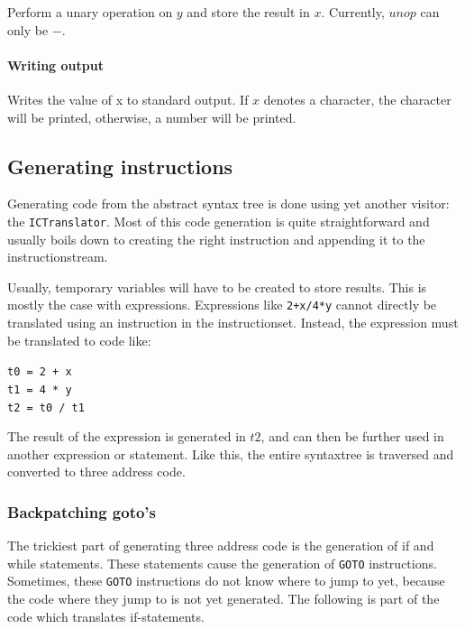 \documentclass[a4paper]{article}
\begin{document}
Perform a unary operation on $y$ and store the result in $x$. Currently,
$unop$ can only be $-$.

\paragraph{Writing output\\}

Writes the value of x to standard output. If $x$ denotes a character, the
character will be printed, otherwise, a number will be printed.

\subsection{Generating instructions}

Generating code from the abstract syntax tree is done using yet another
visitor: the \texttt{ICTranslator}. Most of this code generation is quite
straightforward and usually boils down to creating the right instruction and
appending it to the instructionstream.

Usually, temporary variables will have to be created to store results. This is
mostly the case with expressions. Expressions like \texttt{2+x/4*y} cannot
directly be translated using an instruction in the instructionset. Instead,
the expression must be translated to code like:
\begin{center}
\texttt{t0 = 2 + x}\\
\texttt{t1 = 4 * y}\\
\texttt{t2 = t0 / t1}\\
\end{center}

The result of the expression is generated in $t2$, and can then be further
used in another expression or statement. Like this, the entire syntaxtree is
traversed and converted to three address code.

\subsubsection{Backpatching goto's}

The trickiest part of generating three address code is the generation of if
and while statements. These statements cause the generation of \texttt{GOTO}
instructions. Sometimes, these \texttt{GOTO} instructions do not know where to
jump to yet, because the code where they jump to is not yet generated. The
following is part of the code which translates if-statements.
\end{document}
